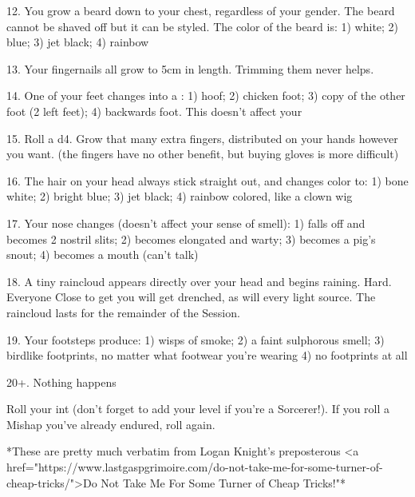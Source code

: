 12. You grow a beard down to your chest, regardless of your gender.  The beard cannot be shaved off but it can be styled.  The color of the beard is: 1) white; 2) blue; 3) jet black; 4) rainbow 



13. Your fingernails all grow to 5cm in length.  Trimming them never helps.



14. One of your feet changes into a : 1) hoof; 2) chicken foot; 3) copy of the other foot (2 left feet); 4) backwards foot.  This doesn't affect your \MD



15. Roll a d4.  Grow that many extra fingers, distributed on your hands however you want.  (the fingers have no other benefit, but buying gloves is more difficult)



16. The hair on your head always stick straight out, and changes color to: 1) bone white; 2) bright blue; 3) jet black; 4) rainbow colored, like a clown wig



17. Your nose changes (doesn't affect your sense of smell):  1) falls off and becomes 2 nostril slits; 2) becomes elongated and warty; 3) becomes a pig's snout; 4) becomes a mouth (can't talk)



18. A tiny raincloud appears directly over your head and begins raining.  Hard.  Everyone Close to get you will get drenched, as will every light source. The raincloud lasts for the remainder of the Session.



19. Your footsteps produce: 1) wisps of smoke; 2) a faint sulphorous smell; 3) birdlike footprints, no matter what footwear you're wearing 4)  no footprints at all
 


20+. Nothing happens










Roll your {int} (don't forget to add your level if you're a Sorcerer!).   If you roll a Mishap you've already endured, roll again.

*These are pretty much verbatim from Logan Knight's preposterous <a href="https://www.lastgaspgrimoire.com/do-not-take-me-for-some-turner-of-cheap-tricks/">Do Not Take Me For Some Turner of Cheap Tricks!"*


